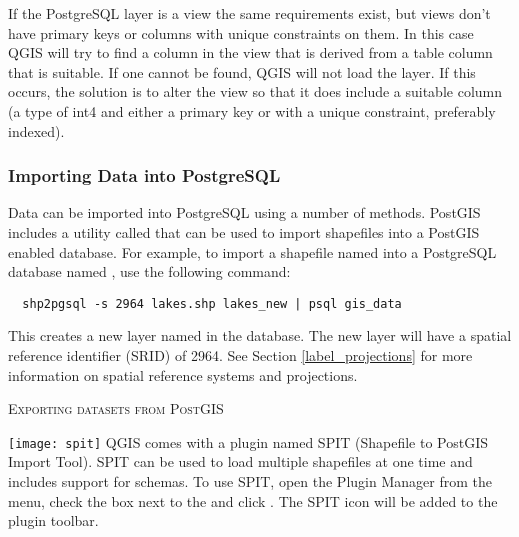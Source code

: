 If the PostgreSQL layer is a view the same requirements exist, but
views don't have primary keys or columns with unique constraints on
them. In this case QGIS will try to find a column in the view that is
derived from a table column that is suitable. If one cannot be found,
QGIS will not load the layer. If this occurs, the solution is to alter
the view so that it does include a suitable column (a type of int4
and either a primary key or with a unique constraint, preferably indexed).

\subsubsection{Importing Data into PostgreSQL}\label{sec:loading_postgis_data}

Data can be imported into PostgreSQL using a number of methods. PostGIS
includes a utility called  that can be used to import shapefiles into
a PostGIS enabled database. For example, to import a shapefile named
into a PostgreSQL database named , use the following command:

\begin{verbatim} 
  shp2pgsql -s 2964 lakes.shp lakes_new | psql gis_data
\end{verbatim}

This creates a new layer named  in the
 database. The
new layer will have a spatial reference identifier (SRID) of 2964. See Section 
\ref{label_projections} for more information on spatial reference systems and
projections.
\begin{Tip}
\caption{\textsc{Exporting datasets from PostGIS}}
\end{Tip}

\texttt{[image: spit]} QGIS comes with a
plugin named 
SPIT (Shapefile to PostGIS Import Tool).
SPIT can be used to load multiple shapefiles at one time and includes support
for schemas. To use SPIT, open the Plugin Manager from the 
menu, check the box next to the  and click . The SPIT
icon will be added to the plugin toolbar. 

